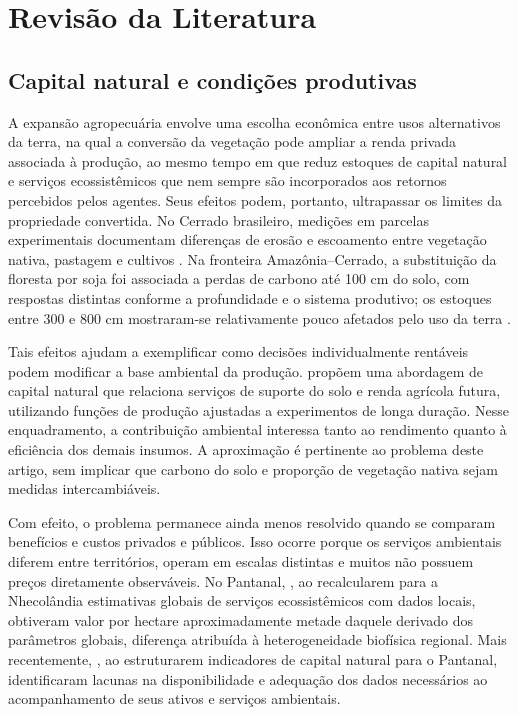 \section{Revisão da Literatura}

\subsection{Capital natural e condições produtivas}

A expansão agropecuária envolve uma escolha econômica entre usos alternativos da terra, na qual a conversão da vegetação pode ampliar a renda privada associada à produção, ao mesmo tempo em que reduz estoques de capital natural e serviços ecossistêmicos que nem sempre são incorporados aos retornos percebidos pelos agentes. Seus efeitos podem, portanto, ultrapassar os limites da propriedade convertida. No Cerrado brasileiro, medições em parcelas experimentais documentam diferenças de erosão e escoamento entre vegetação nativa, pastagem e cultivos \cite{Schwamback2024}. Na fronteira Amazônia--Cerrado, a substituição da floresta por soja foi associada a perdas de carbono até 100 cm do solo, com respostas distintas conforme a profundidade e o sistema produtivo; os estoques entre 300 e 800 cm mostraram-se relativamente pouco afetados pelo uso da terra \cite{Popin2025}.

Tais efeitos ajudam a exemplificar como decisões individualmente rentáveis podem modificar a base ambiental da produção.  propõem uma abordagem de capital natural que relaciona serviços de suporte do solo e renda agrícola futura, utilizando funções de produção ajustadas a experimentos de longa duração. Nesse enquadramento, a contribuição ambiental interessa tanto ao rendimento quanto à eficiência dos demais insumos. A aproximação é pertinente ao problema deste artigo, sem implicar que carbono do solo e proporção de vegetação nativa sejam medidas intercambiáveis.

Com efeito, o problema permanece ainda menos resolvido quando se comparam benefícios e custos privados e públicos. Isso ocorre porque os serviços ambientais diferem entre territórios, operam em escalas distintas e muitos não possuem preços diretamente observáveis. No Pantanal, , ao recalcularem para a Nhecolândia estimativas globais de serviços ecossistêmicos com dados locais, obtiveram valor por hectare aproximadamente metade daquele derivado dos parâmetros globais, diferença atribuída à heterogeneidade biofísica regional. Mais recentemente, , ao estruturarem indicadores de capital natural para o Pantanal, identificaram lacunas na disponibilidade e adequação dos dados necessários ao acompanhamento de seus ativos e serviços ambientais.

